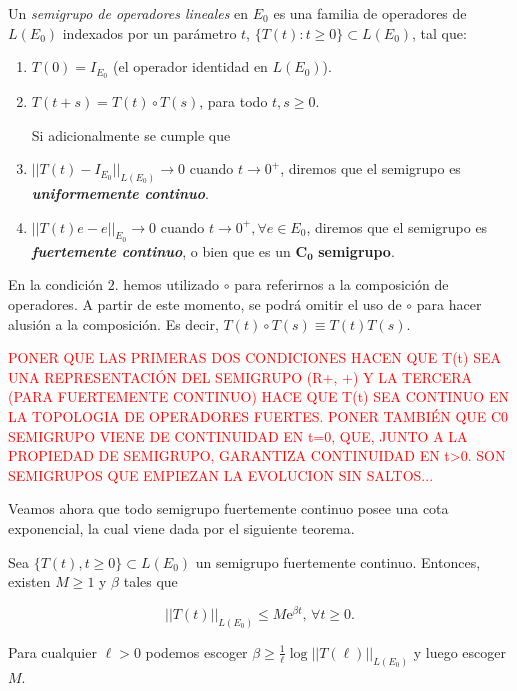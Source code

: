 \begin{Definicion}
\label{ch:semigrupos:def:semigrupo}

Un \textit{semigrupo de operadores lineales} en $E_0$ es una familia de operadores de $L(E_0)$ indexados por un parámetro $t$, $\{T(t) : t \geq 0\} \subset L(E_0)$, tal que:

\begin{enumerate}
    \item $T(0) = I_{E_0}$ (el operador identidad en $L(E_0)$).

    \item $T(t+s) = T(t) \circ T(s)$, para todo $t,s \geq 0$.

    Si adicionalmente se cumple que

    \item $||T(t) - I_{E_0}||_{L(E_0)} \rightarrow 0$ cuando $t \rightarrow 0^+$, diremos que el semigrupo es \textbf{\textit{uniformemente continuo}}.

     \item $||T(t)e - e||_{E_0} \rightarrow 0$ cuando $t \rightarrow 0^+, \forall e \in E_0$, diremos que el semigrupo es \textbf{\textit{fuertemente continuo}}, o bien que es un $\boldsymbol{C_0}$ \textbf{semigrupo}.
\end{enumerate}

En la condición $2.$ hemos utilizado $\circ$ para referirnos a la composición de operadores. A partir de este momento, se podrá omitir el uso de $\circ$ para hacer alusión a la composición. Es decir, $T(t) \circ T(s) \equiv T(t)T(s)$.

\textcolor{red}{PONER QUE LAS PRIMERAS DOS CONDICIONES HACEN QUE T(t) SEA UNA REPRESENTACIÓN DEL SEMIGRUPO (R+, +) Y LA TERCERA (PARA FUERTEMENTE CONTINUO) HACE QUE T(t) SEA CONTINUO EN LA TOPOLOGIA DE OPERADORES FUERTES. PONER TAMBIÉN QUE C0 SEMIGRUPO VIENE DE CONTINUIDAD EN t=0, QUE, JUNTO A LA PROPIEDAD DE SEMIGRUPO, GARANTIZA CONTINUIDAD EN t>0. SON SEMIGRUPOS QUE EMPIEZAN LA EVOLUCION SIN SALTOS...}
\end{Definicion}

Veamos ahora que todo semigrupo fuertemente continuo posee una cota exponencial, la cual viene dada por el siguiente teorema.\\

\begin{Teorema}
\label{ch:semigrupos:th:cotaExp}

Sea $\{T(t), t \geq 0 \} \subset L(E_0)$ un semigrupo fuertemente continuo. Entonces, existen $M \geq 1$ y $\beta$ tales que

\[||T(t)||_{L(E_0)} \leq M\mathrm{e}^{\beta t}, \, \forall t \geq 0.\]

Para cualquier $\ell > 0$ podemos escoger $\beta \geq \frac{1}{\ell} \log ||T(\ell)||_{L(E_0)}$ y luego escoger $M$.
\end{Teorema}

